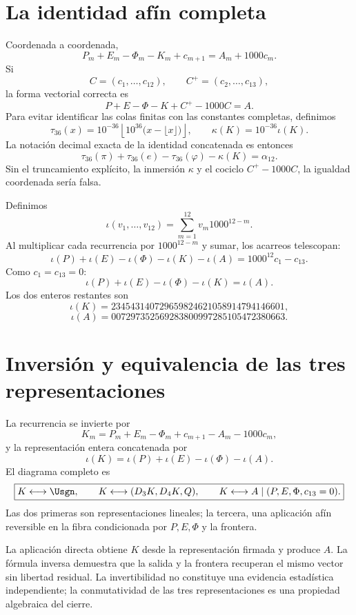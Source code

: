 \section{La identidad afín completa}

Coordenada a coordenada,
\[
\boxed{
P_m+E_m-\Phi_m-K_m+c_{m+1}
=A_m+1000c_m.}
\]
Si
\[
C=(c_1,\ldots,c_{12}),
\qquad
C^+=(c_2,\ldots,c_{13}),
\]
la forma vectorial correcta es
\[
\boxed{P+E-\Phi-K+C^+-1000C=A.}
\]
Para evitar identificar las colas finitas con las constantes completas,
definimos
\[
 \tau_{36}(x)=10^{-36}\left\lfloor10^{36}
 \bigl(x-\lfloor x\rfloor\bigr)\right\rfloor,
 \qquad
 \kappa(K)=10^{-36}\iota(K).
\]
La notación decimal exacta de la identidad concatenada es entonces
\[
 \tau_{36}(\pi)+\tau_{36}(e)-\tau_{36}(\varphi)-\kappa(K)
 =\alpha_{12}.
\]
Sin el truncamiento explícito, la inmersión \(\kappa\) y el cociclo
\(C^+-1000C\), la igualdad coordenada sería falsa.

Definimos
\[
\iota(v_1,\ldots,v_{12})
=\sum_{m=1}^{12}v_m1000^{12-m}.
\]
Al multiplicar cada recurrencia por \(1000^{12-m}\) y sumar, los acarreos
telescopan:
\[
\iota(P)+\iota(E)-\iota(\Phi)-\iota(K)-\iota(A)
=1000^{12}c_1-c_{13}.
\]
Como \(c_1=c_{13}=0\):
\[
\boxed{
\iota(P)+\iota(E)-\iota(\Phi)-\iota(K)=\iota(A).}
\]
Los dos enteros restantes son
\[
\iota(K)=234543140729659824621058914794146601,
\]
\[
\iota(A)=007297352569283800997285105472380663.
\]

\section{Inversión y equivalencia de las tres representaciones}

La recurrencia se invierte por
\[
K_m=P_m+E_m-\Phi_m+c_{m+1}-A_m-1000c_m,
\]
y la representación entera concatenada por
\[
\iota(K)=\iota(P)+\iota(E)-\iota(\Phi)-\iota(A).
\]
El diagrama completo es
\[
\boxed{
K\longleftrightarrow\Usgn,
\qquad
K\longleftrightarrow(D_3K,D_4K,Q),
\qquad
K\longleftrightarrow A\mid(P,E,\Phi,c_{13}=0).}
\]
Las dos primeras son representaciones lineales; la tercera, una aplicación
afín reversible en la fibra
condicionada por \(P,E,\Phi\) y la frontera.

\begin{remark}
La aplicación directa obtiene \(K\) desde la representación firmada y produce
\(A\). La fórmula inversa demuestra que la salida y la frontera recuperan el
mismo vector sin libertad residual. La invertibilidad no constituye una
evidencia estadística independiente; la conmutatividad de las tres
representaciones es una propiedad algebraica del cierre.
\end{remark}

